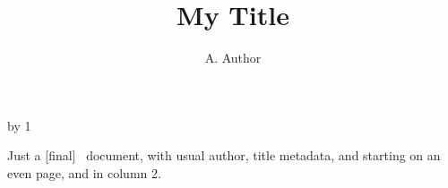 \documentclass[final,secondcolstart]{ltugboat}
\author{A. Author}
\title{My Title}
\begin{document}
\advance{} by 1
\maketitle
Just a [final] \TUB\ document, with usual author, title metadata,
and starting on an even page, and in column 2.
\end{document}
